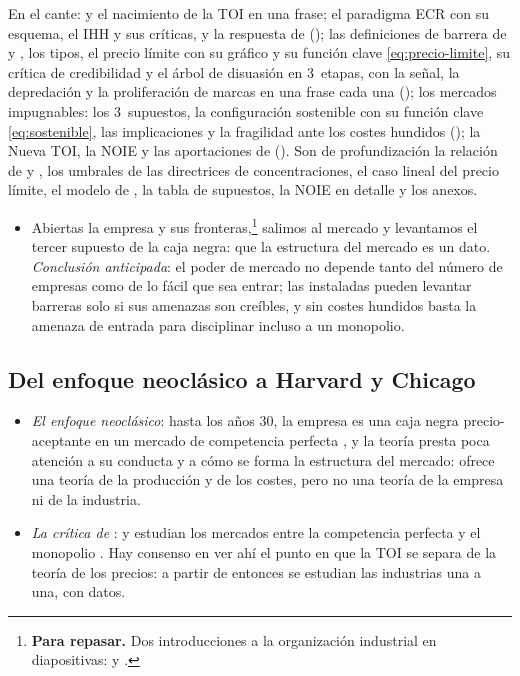 \documentclass[11pt]{article}
\begin{document}
\begin{notaopositor}
En el cante:  y el nacimiento de la TOI en una frase; el paradigma ECR con su esquema, el IHH y sus críticas, y la respuesta de  (); las definiciones de barrera de  y , los tipos, el precio límite con su gráfico y su función clave \eqref{eq:precio-limite}, su crítica de credibilidad y el árbol de disuasión en 3~etapas, con la señal, la depredación y la proliferación de marcas en una frase cada una (); los mercados impugnables: los 3~supuestos, la configuración sostenible con su función clave \eqref{eq:sostenible}, las implicaciones y la fragilidad ante los costes hundidos (); la Nueva TOI, la NOIE y las aportaciones de  (). Son de profundización la relación de  y , los umbrales de las directrices de concentraciones, el caso lineal del precio límite, el modelo de , la tabla de supuestos, la NOIE en detalle y los anexos.
\end{notaopositor}

\begin{itemize}
\item Abiertas la empresa y sus fronteras,\footnote{\textbf{Para repasar.} Dos introducciones a la organización industrial en diapositivas: \textcite{UVigoEconomiaIndustrial} y \textcite{Machado2006Introduccion}.} salimos al mercado y levantamos el tercer supuesto de la caja negra: que la estructura del mercado es un dato. \emph{Conclusión anticipada}: el poder de mercado no depende tanto del número de empresas como de lo fácil que sea entrar; las instaladas pueden levantar barreras solo si sus amenazas son creíbles, y sin costes hundidos basta la amenaza de entrada para disciplinar incluso a un monopolio.
\end{itemize}

\subsection{Del enfoque neoclásico a Harvard y Chicago}\label{sec:harvard-chicago}

\begin{itemize}
\item \emph{El enfoque neoclásico}: hasta los años 30, la empresa es una caja negra precio-aceptante en un mercado de competencia perfecta , y la teoría presta poca atención a su conducta y a cómo se forma la estructura del mercado: ofrece una teoría de la producción y de los costes, pero no una teoría de la empresa ni de la industria.
\item \emph{La crítica de }: \textcite{Chamberlin1933Theory} y \textcite{Robinson1933Economics} estudian los mercados entre la competencia perfecta y el monopolio . Hay consenso en ver ahí el punto en que la TOI se separa de la teoría de los precios: a partir de entonces se estudian las industrias una a una, con datos.
\end{itemize}
\end{document}
